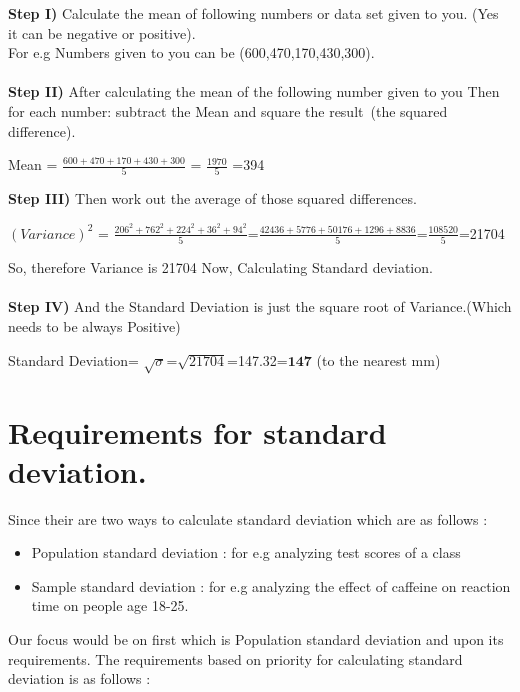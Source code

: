 \documentclass{article}
\begin{document}
 \textbf{Step I)}  Calculate the mean of following numbers or data set given to you. (Yes it can be negative or positive).\\
  For e.g Numbers given to you can be (600,470,170,430,300).
  \\\\
 \textbf{Step II)} After calculating the mean of the following number given to you  Then for each number: subtract the Mean and square the result\ (the squared difference).
 \\
 \begin{center}
                    Mean = $\frac{600 + 470 + 170 + 430 + 300}{5}$  = $\frac{1970}{5}$ =394
 \end{center} 
 
 \textbf{Step III)} Then work out the average of those squared differences.\\
  \begin{center}
        $(Variance)^2$ = $\frac{206^2 + 762^2 + 224^2 + 36^2 + 94^2}{5}$=$\frac{42436 + 5776 + 50176 + 1296 + 8836}{5}$=$\frac{108520}{5}$=21704
      
 \end{center} 
   So, therefore Variance is 21704 Now, Calculating Standard deviation.
   \\\\
 \textbf{Step IV)} And the Standard Deviation is just the square root of Variance.(Which needs to be always Positive)\\
  \begin{center}
       Standard Deviation= $\sqrt{\sigma}$=$\sqrt{21704}$=147.32=$\textbf{147}$ (to the nearest mm)
 \end{center} 
 
 \section{Requirements for standard deviation.}
 Since their are two ways to calculate standard deviation which are as follows :
 \begin{itemize}
  \item Population standard deviation :	for e.g analyzing test scores of a class 
  \item Sample standard deviation  : for e.g analyzing the effect of caffeine on reaction time on people age 18-25.
\end{itemize}

Our focus would be on first which is Population standard deviation and upon its requirements.
The requirements based on priority for calculating standard deviation is as follows :
\end{document}
